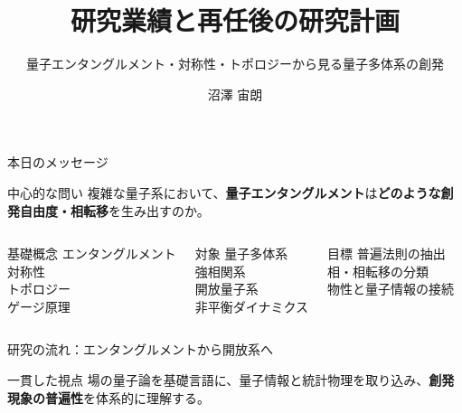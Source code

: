 \documentclass[aspectratio=169,11pt]{beamer}
\title{研究業績と再任後の研究計画}
\subtitle{量子エンタングルメント・対称性・トポロジーから見る量子多体系の創発}
\author{沼澤 宙朗}
\institute{東京大学物性研究所}
\date{}
\newcommand{\key}[1]{\textcolor{accent}{\bfseries #1}}
\begin{document}
\begin{frame}
  \titlepage
\end{frame}

\begin{frame}{本日のメッセージ}
\begin{block}{中心的な問い}
\centering
\Large 複雑な量子系において、\key{量子エンタングルメント}は\key{どのような創発自由度・相転移}を生み出すのか。
\end{block}
\vspace{0.4em}
\begin{columns}[T]
\begin{block}{基礎概念}
エンタングルメント\\対称性\\トポロジー\\ゲージ原理
\end{block}
\begin{block}{対象}
量子多体系\\強相関系\\開放量子系\\非平衡ダイナミクス
\end{block}
\begin{block}{目標}
普遍法則の抽出\\相・相転移の分類\\物性と量子情報の接続
\end{block}
\end{columns}
\end{frame}

\begin{frame}{研究の流れ：エンタングルメントから開放系へ}
\centering
{}
\vspace{1.1em}
\begin{block}{一貫した視点}
場の量子論を基礎言語に、量子情報と統計物理を取り込み、\key{創発現象の普遍性}を体系的に理解する。
\end{block}
\end{frame}
\end{document}
